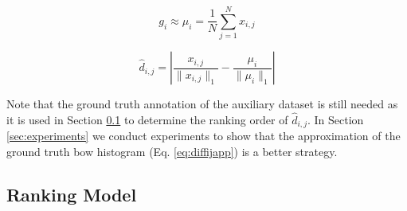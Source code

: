 \documentclass{bmvc2k}
\def\bow{{{\sc b}o{\sc w} }}
\begin{document}

\noindent\begin{minipage}{0.5\linewidth}
\begin{equation}
g_{i} \approx \mu_{i} = \frac{1}{N} \sum_{j=1}^N x_{i,j}
\label{eq:auxapp}
\end{equation}
\end{minipage}
\begin{minipage}{0.5\linewidth}
\begin{equation}
\hat{d}_{i,j} = \left| \frac{x_{i,j}}{\| x_{i,j} \|_1} - \frac{\mu_{i}}{\| \mu_{i} \|_1 } \right|
\label{eq:diffijapp}
\end{equation}
\end{minipage}

\noindent Note that the ground truth annotation of the auxiliary dataset is still needed as it is used in Section \ref{sec:Ranking_SVM} to determine the ranking order of $\hat{d}_{i,j}$. In Section \ref{sec:experiments} we conduct experiments to show that the approximation of the ground truth \bow histogram (Eq. \ref{eq:diffijapp}) is a better strategy.


\subsection{Ranking Model}
\label{sec:Ranking_SVM}
\end{document}

